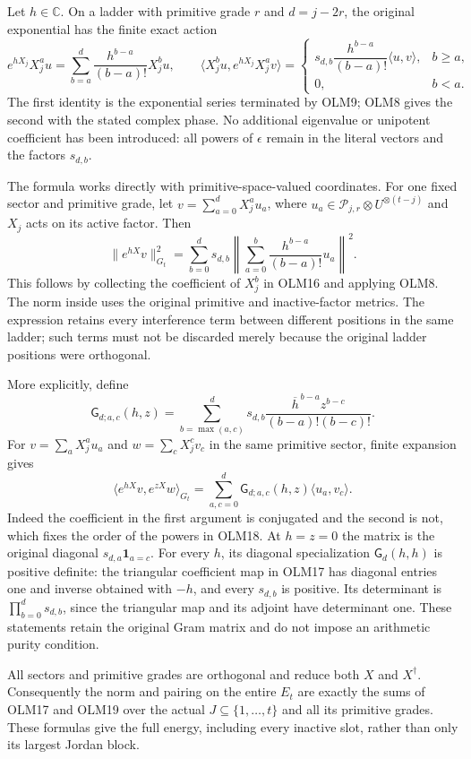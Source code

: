 Let $h\in\mathbb C$. On a ladder with primitive grade $r$ and
$d=j-2r$, the original exponential has the finite exact action
\[
e^{hX_j}X_j^a u
=\sum_{b=a}^d\frac{h^{b-a}}{(b-a)!}X_j^b u,
\qquad
\langle X_j^b u,e^{hX_j}X_j^a v\rangle
=\begin{cases}
s_{d,b}\dfrac{h^{b-a}}{(b-a)!}\langle u,v\rangle,&b\ge a,\\
0,&b<a.
\end{cases}
\tag{OLM16}
\]
The first identity is the exponential series terminated by
OLM9; OLM8 gives the second with the stated complex phase.
No additional eigenvalue or unipotent coefficient has been
introduced: all powers of $\epsilon$ remain in the literal
vectors and the factors $s_{d,b}$.

The formula works directly with primitive-space-valued coordinates.
For one fixed sector and primitive grade, let
$v=\sum_{a=0}^dX_j^a u_a$, where
$u_a\in\mathcal P_{j,r}\otimes U^{\otimes(t-j)}$ and $X_j$
acts on its active factor. Then
\[
\boxed{
\|e^{hX}v\|_{G_t}^2
=\sum_{b=0}^d s_{d,b}
   \left\|\sum_{a=0}^b\frac{h^{b-a}}{(b-a)!}u_a\right\|^2.}
\tag{OLM17}
\]
This follows by collecting the coefficient of $X_j^b$ in
OLM16 and applying OLM8. The norm inside uses the original
primitive and inactive-factor metrics. The expression retains
every interference term between different positions in the
same ladder; such terms must not be discarded merely because
the original ladder positions were orthogonal.

More explicitly, define
\[
\mathsf G_{d;a,c}(h,z)
=\sum_{b=\max(a,c)}^d s_{d,b}
 \frac{\overline h^{\,b-a}z^{b-c}}
      {(b-a)!(b-c)!}.
\tag{OLM18}
\]
For $v=\sum_aX_j^a u_a$ and $w=\sum_cX_j^c v_c$ in the same
primitive sector, finite expansion gives
\[
\langle e^{hX}v,e^{zX}w\rangle_{G_t}
=\sum_{a,c=0}^d\mathsf G_{d;a,c}(h,z)\langle u_a,v_c\rangle.
\tag{OLM19}
\]
Indeed the coefficient in the first argument is conjugated and
the second is not, which fixes the order of the powers in
OLM18. At $h=z=0$ the matrix is the original diagonal
$s_{d,a}\mathbf1_{a=c}$.
For every $h$, its diagonal specialization $\mathsf G_d(h,h)$
is positive definite: the triangular coefficient map in OLM17
has diagonal entries one and inverse obtained with $-h$, and
every $s_{d,b}$ is positive. Its determinant is
$\prod_{b=0}^d s_{d,b}$, since the triangular map and its adjoint
have determinant one. These statements retain the original
Gram matrix and do not impose an arithmetic purity condition.

All sectors and primitive grades are orthogonal and reduce
both $X$ and $X^\dagger$. Consequently the norm and pairing on
the entire $E_t$ are exactly the sums of OLM17 and OLM19 over
the actual $J\subseteq\{1,\ldots,t\}$ and all its primitive
grades. These formulas give the full energy, including every
inactive slot, rather than only its largest Jordan block.

